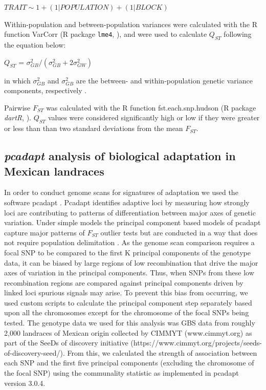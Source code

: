 \documentclass[9pt,twocolumn,twoside,lineno]{gsajnl}
\begin{document}
\begin{center}
${ TRAIT \sim 1 + (1|POPULATION) + (1|BLOCK) }$
\end{center}

Within-population and between-population variances were calculated with the R function VarCorr (R package \texttt{lme4}, \citealp{bates2014lme4}), and were used to calculate $Q_{ST}$ following the equation below:

\begin{center}
$Q_{ST}$ = \(\sigma^{2}_{GB}/(\sigma^{2}_{GB}+2\sigma^{2}_{GW})\)
\end{center}

\noindent in which $\sigma^{2}_{GB}$ and $\sigma^{2}_{GB}$ are the between- and within-population genetic variance components, respectively \citep{Leinonen2013-ic}.

Pairwise $F_{ST}$ was calculated with the R function fst.each.snp.hudson (R package \textit{dartR}, \citealp{gruber2018dartr}).
$Q_{ST}$ values were considered significantly high or low if they were greater or less than than two standard deviations from the mean $F_{ST}$.


\subsection{\textit{pcadapt} analysis of biological adaptation in Mexican landraces}

In order to conduct genome scans for signatures of adaptation we used the software pcadapt \citep{Luu2017-ws}.
Pcadapt identifies adaptive loci by measuring how strongly loci are contributing to patterns of differentiation between major axes of genetic variation.
Under simple models the principal component based models of pcadapt capture major patterns of $F_{ST}$ outlier tests but are conducted in a way that does not require population delimitation \citep{duforet2014genome}.
As the genome scan comparison requires a focal SNP to be compared to the first K principal components of the genotype data, it can be biased by large regions of low recombination that drive the major axes of variation in the principal components.
Thus, when SNPs from these low recombination regions are compared against principal components driven by linked loci spurious signals may arise.
To prevent this bias from occurring, we used custom scripts to calculate the principal component step separately based upon all the chromosomes except for the chromosome of the focal SNPs being tested.
The genotype data we used for this analysis was GBS data from roughly 2,000 landraces of Mexican origin collected by CIMMYT (www.cimmyt.org) as part of the SeeDs of discovery initiative (https://www.cimmyt.org/projects/seeds-of-discovery-seed/).
From this, we calculated the strength of association between each SNP and the first five principal components (excluding the chromosome of the focal SNP) using the communality statistic as implemented in pcadapt version 3.0.4.
\end{document}
